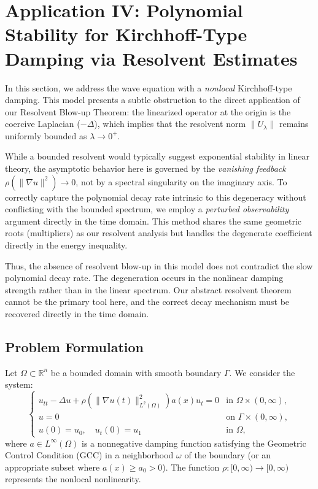 \documentclass[11pt,reqno]{amsart}
\theoremstyle{remark}
\begin{document}
\section{Application IV: Polynomial Stability for Kirchhoff-Type Damping via Resolvent Estimates}
\label{sec:app_kirchhoff}

In this section, we address the wave equation with a \textit{nonlocal} Kirchhoff-type damping.
This model presents a subtle obstruction to the direct application of our Resolvent Blow-up Theorem: the linearized operator at the origin is the coercive Laplacian ($-\Delta$), which implies that the resolvent norm $\|U_\lambda\|$ remains uniformly bounded as $\lambda \to 0^+$.

While a bounded resolvent would typically suggest exponential stability in linear theory, the asymptotic behavior here is governed by the \textit{vanishing feedback} $\rho(\|\nabla u\|^2) \to 0$, not by a spectral singularity on the imaginary axis. To correctly capture the polynomial decay rate intrinsic to this degeneracy without conflicting with the bounded spectrum, we employ a \textit{perturbed observability} argument directly in the time domain. This method shares the same geometric roots (multipliers) as our resolvent analysis but handles the degenerate coefficient directly in the energy inequality.

Thus, the absence of resolvent blow-up in this model does not contradict the slow polynomial decay rate. The degeneration occurs in the nonlinear damping strength rather than in the linear spectrum. Our abstract resolvent theorem cannot be the primary tool here, and the correct decay mechanism must be recovered directly in the time domain.

\subsection{Problem Formulation}
Let $\Omega \subset \mathbb{R}^n$ be a bounded domain with smooth boundary $\Gamma$. We consider the system:
\begin{equation}\label{kirchhoff_prob}
\begin{cases}
u_{tt} - \Delta u + \rho(\|\nabla u(t)\|_{L^2(\Omega)}^2) a(x) u_t = 0 & \text{in } \Omega \times (0, \infty), \\
u = 0 & \text{on } \Gamma \times (0, \infty), \\
u(0) = u_0, \quad u_t(0) = u_1 & \text{in } \Omega,
\end{cases}
\end{equation}
where $a \in L^\infty(\Omega)$ is a nonnegative damping function satisfying the Geometric Control Condition (GCC) in a neighborhood $\omega$ of the boundary (or an appropriate subset where $a(x) \ge a_0 > 0$). The function $\rho: [0, \infty) \to [0, \infty)$ represents the nonlocal nonlinearity.
\end{document}
